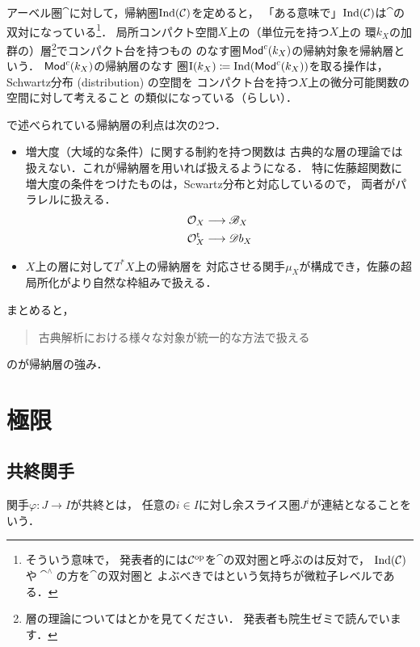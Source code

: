 アーベル圏$\cat$に対して，帰納圏$\mathop{\mathrm{Ind}}(\mathcal{C})$を定めると，
「ある意味で」$\mathop{\mathrm{Ind}}(\mathcal{C})$は$\cat$の双対になっている\footnote{
    そういう意味で，
    発表者的には$\mathcal{C}^{\rm op}$を$\cat$の双対圏と呼ぶのは反対で，
    $\mathop{\mathrm{Ind}}(\mathcal{C})$や$\cat^\wedge$の方を$\cat$の双対圏と
    よぶべきではという気持ちが微粒子レベルである．
}．
局所コンパクト空間$X$上の（単位元を持つ$X$上の
環$k_X$の加群の）層\footnote{
    層の理論については\cite{KS90}とかを見てください．
    発表者も院生ゼミで読んでいます．
}でコンパクト台を持つもの
のなす圏$\mathop{\textsf{Mod}}\nolimits^c(k_X)$の帰納対象を帰納層という．
$\mathop{\textsf{Mod}}\nolimits^c(k_X)$の帰納層のなす
圏$\mathrm{I}(k_X)\coloneqq\mathop{\mathrm{Ind}}(\mathop{\textsf{Mod}}\nolimits^c(k_X))$を取る操作は，
Schwartz分布 (distribution) の空間を
コンパクト台を持つ$X$上の微分可能関数の空間に対して考えること
の類似になっている（らしい）．

\cite{KS99}で述べられている帰納層の利点は次の2つ．
\begin{itemize}
    \item 増大度（大域的な条件）に関する制約を持つ関数は
    古典的な層の理論では扱えない．これが帰納層を用いれば扱えるようになる．
    特に佐藤超関数に増大度の条件をつけたものは，Scwartz分布と対応しているので，
    両者がパラレルに扱える．
    \begin{align*}
        \mathcal{O}_X&\longrightarrow \mathscr{B}_X\\
        \mathcal{O}^\mathrm{t}_X&\longrightarrow \mathscr{D}b_X
    \end{align*}
    \item $X$上の層に対して$T^\ast X$上の帰納層を
    対応させる関手$\mu_X$が構成でき，佐藤の超局所化がより自然な枠組みで扱える．
\end{itemize}

まとめると，
\begin{quote}
    古典解析における様々な対象が統一的な方法で扱える
\end{quote}
のが帰納層の強み．











\section{極限}

\subsection{共終関手}
\begin{Definition}
    関手$\varphi\colon J\to I$が共終とは，
    任意の$i\in I$に対し余スライス圏$J^i$が連結となることをいう．
\end{Definition}


